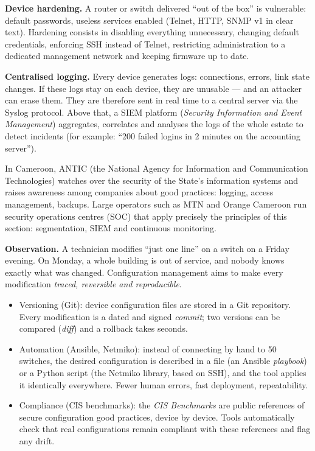 \documentclass[11pt]{article}
\newcommand{\cle}[1]{{\popxbold\color{popdark}#1}}
\newcounter{popsec}
\newcounter{popsub}
\newcommand{\courssub}[1]{%
  \stepcounter{popsub}%
  \par\vspace{9pt}\noindent{\popxbold\fontsize{11.5}{13}\selectfont\color{popink}{\color{poporange}\thepopsec.\thepopsub}\hspace{6pt}#1}\par\nopagebreak\vspace{4pt}
}
\begin{document}
\textbf{Device hardening.} A router or switch delivered ``out of the box'' is vulnerable: default passwords, useless services enabled (Telnet, HTTP, SNMP v1 in clear text). \cle{Hardening} consists in disabling everything unnecessary, changing default credentials, enforcing SSH instead of Telnet, restricting administration to a dedicated management network and keeping firmware up to date.

\textbf{Centralised logging.} Every device generates \cle{logs}: connections, errors, link state changes. If these logs stay on each device, they are unusable --- and an attacker can erase them. They are therefore sent in real time to a central server via the \cle{Syslog} protocol. Above that, a \cle{SIEM} platform (\emph{Security Information and Event Management}) aggregates, correlates and analyses the logs of the whole estate to detect incidents (for example: ``200 failed logins in 2 minutes on the accounting server'').

\begin{savaistu}
In Cameroon, \cle{ANTIC} (the National Agency for Information and Communication Technologies) watches over the security of the State's information systems and raises awareness among companies about good practices: logging, access management, backups. Large operators such as MTN and Orange Cameroon run security operations centres (SOC) that apply precisely the principles of this section: segmentation, SIEM and continuous monitoring.
\end{savaistu}

\courssub{Configuration management: mastering change}

\textbf{Observation.} A technician modifies ``just one line'' on a switch on a Friday evening. On Monday, a whole building is out of service, and nobody knows exactly what was changed. \cle{Configuration management} aims to make every modification \emph{traced, reversible and reproducible}.

\begin{itemize}
\item \cle{Versioning (Git)}: device configuration files are stored in a Git repository. Every modification is a dated and signed \emph{commit}; two versions can be compared (\emph{diff}) and a rollback takes seconds.
\item \cle{Automation (Ansible, Netmiko)}: instead of connecting by hand to 50 switches, the desired configuration is described in a file (an Ansible \emph{playbook}) or a Python script (the \cle{Netmiko} library, based on SSH), and the tool applies it identically everywhere. Fewer human errors, fast deployment, repeatability.
\item \cle{Compliance (CIS benchmarks)}: the \emph{CIS Benchmarks} are public references of secure configuration good practices, device by device. Tools automatically check that real configurations remain compliant with these references and flag any drift.
\end{itemize}
\end{document}
